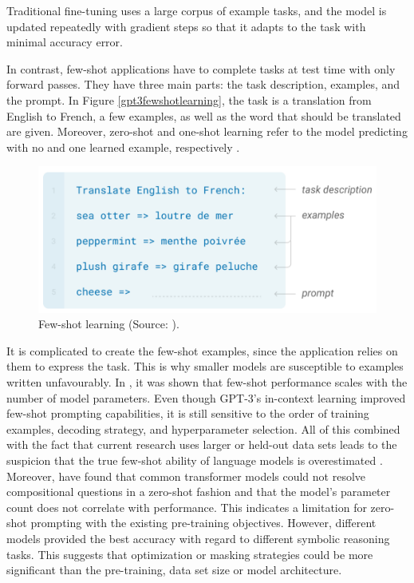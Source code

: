 \documentclass[
]{krantz}
\begin{document}
Traditional fine-tuning uses a large corpus of example tasks, and the
model is updated repeatedly with gradient steps so that it adapts to the
task with minimal accuracy error.

In contrast, few-shot applications have to complete tasks at test time
with only forward passes. They have three main parts: the task
description, examples, and the prompt. In Figure \ref{gpt3fewshotlearning}, the task is a translation
from English to French, a few examples, as well as the word that should
be translated are given. Moreover, zero-shot and one-shot learning refer
to the model predicting with no and one learned example, respectively
\citep{brown2020language}.

\begin{figure}

{\centering \includegraphics[width=0.5\linewidth]{./figures/01-01-nlp/gpt3_few-shot-learning} 

}

\caption{Few-shot learning (Source: \citet{brown2020language}).}\label{fig:gpt3fewshotlearning}
\end{figure}



It is complicated to create the few-shot examples, since the application
relies on them to express the task. This is why smaller models are
susceptible to examples written unfavourably. In \citet{brown2020language}, it was
shown that few-shot performance scales with the number of model
parameters. Even though GPT-3's in-context learning improved few-shot
prompting capabilities, it is still sensitive to the order of training
examples, decoding strategy, and hyperparameter selection. All of this
combined with the fact that current research uses larger or held-out
data sets leads to the suspicion that the true few-shot ability of
language models is overestimated \citep{Perez2021}.\\

Moreover, \citet{Lialin2022} have found that common transformer models could
not resolve compositional questions in a zero-shot fashion and that the
model's parameter count does not correlate with performance. This
indicates a limitation for zero-shot prompting with the existing
pre-training objectives. However, different models provided the best
accuracy with regard to different symbolic reasoning tasks. This
suggests that optimization or masking strategies could be more
significant than the pre-training, data set size or model architecture.
\end{document}
